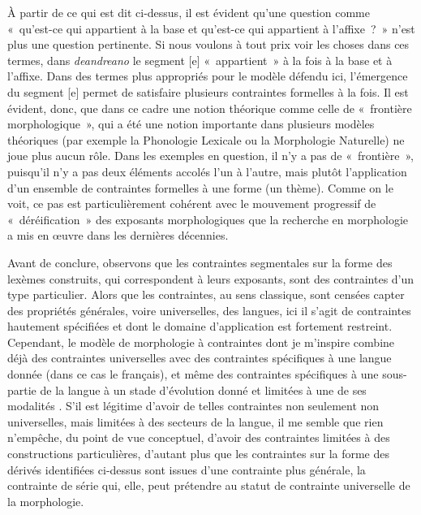 \documentclass[output=paper]{langsci/langscibook}
\begin{document}
À partir de ce qui est dit ci-dessus, il est évident qu'une question
comme «~qu'est-ce qui appartient à la base et qu'est-ce qui appartient à
l'affixe~?~» n'est plus une question pertinente. Si nous voulons à tout
prix voir les choses dans ces termes, dans \emph{deandreano} le segment
{[}e{]} «~appartient~» à la fois à la base et à l'affixe. Dans des termes
plus appropriés pour le modèle défendu ici, l'émergence du segment
{[}e{]} permet de satisfaire plusieurs contraintes formelles à la fois.
Il est évident, donc, que dans ce cadre une notion théorique comme celle
de «~frontière morphologique~», qui a été une notion importante dans
plusieurs modèles théoriques (par exemple la Phonologie Lexicale ou la
Morphologie Naturelle) ne joue plus aucun rôle. Dans les exemples en
question, il n'y a pas de «~frontière~», puisqu'il n'y a pas deux éléments
accolés l'un à l'autre, mais plutôt l'application d'un ensemble de
contraintes formelles à une forme (un thème). Comme on le voit, ce pas
est particulièrement cohérent avec le mouvement progressif de
«~déréification~» des exposants morphologiques que la recherche en
morphologie a mis en œuvre dans les dernières décennies.

Avant de conclure, observons que les contraintes segmentales sur la
forme des lexèmes construits, qui correspondent à leurs exposants, sont
des contraintes d'un type particulier. Alors que les contraintes, au
sens classique, sont censées capter des propriétés générales, voire
universelles, des langues, ici il s'agit de contraintes hautement
spécifiées et dont le domaine d'application est fortement restreint.
Cependant, le modèle de morphologie à contraintes dont je m'inspire
combine déjà des contraintes universelles avec des contraintes
spécifiques à une langue donnée (dans ce cas le français), et même des
contraintes spécifiques à une sous-partie de la langue à un stade
d'évolution donné et limitées à une de ses modalités %
\citep[par exemple la «~Contrainte de fidélité phonographique~»,][1873]{Roche14}%
%
.
S'il est légitime d'avoir de telles contraintes non seulement non
universelles, mais limitées à des secteurs de la langue, il me semble
que rien n'empêche, du point de vue conceptuel, d'avoir des contraintes
limitées à des constructions particulières, d'autant plus que les
contraintes sur la forme des dérivés identifiées ci-dessus sont issues
d'une contrainte plus générale, la contrainte de série qui, elle, peut
prétendre au statut de contrainte universelle de la morphologie.
\end{document}

